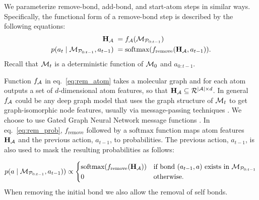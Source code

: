 We parameterize remove-bond, add-bond, and start-atom steps in similar ways. Specifically, the functional form of a remove-bond step is described by the following equations:
\begin{align}
{\mathbf{H}}_{{\mathcal{A}}} \;&= f_{{\mathcal{A}}}({\mathcal{M}}_{{\mathcal{P}}_{0:t-1}}) \label{eq:rem_atom} \\
p(a_t \mid {\mathcal{M}}_{{\mathcal{P}}_{0:t-1}}, a_{t-1}) \;&= \mbox{softmax}(f_{\textrm{remove}}({\mathbf{H}}_{{\mathcal{A}}}, a_{t-1})). \label{eq:rem_prob}\end{align}
Recall that ${\mathcal{M}}_t$ is a deterministic function of ${\mathcal{M}}_0$ and $a_{0:t-1}$.

Function $f_{{\mathcal{A}}}$ in eq.~\eqref{eq:rem_atom} takes a molecular graph and for each atom outputs a set of $d$-dimensional atom features, so that ${\mathbf{H}}_{{\mathcal{A}}} \subseteq \mathcal{R}^{|{\mathcal{A}}| \times d}$. 
In general $f_{{\mathcal{A}}}$ could be any deep graph model that uses the graph structure of ${\mathcal{M}}_t$ to get graph-isomorphic node features, usually via message-passing techniques \citep{gilmer2017neural}. We choose to use Gated Graph Neural Network message functions \citep{li2016gated}.
In eq.~\eqref{eq:rem_prob}, $f_{\textrm{remove}}$ followed by a $\mbox{softmax}$ function maps atom features ${\mathbf{H}}_{{\mathcal{A}}}$ and the previous action, $a_{t-1}$, to probabilities. The previous action, $a_{t-1}$, is also used to mask the resulting probabilities as follows:

\begin{align}
p(a \mid {\mathcal{M}}_{{\mathcal{P}}_{0:t-1}}, a_{t-1})) \propto 
\begin{cases}
\mbox{softmax}(f_{\textrm{remove}}({\mathbf{H}}_{{\mathcal{A}}})) & \mbox{if bond } (a_{t-1},a) \mbox{ exists in } {\mathcal{M}}_{{\mathcal{P}}_{0:t-1}} \\
0 & \mbox{otherwise}. \nonumber
\end{cases}
\end{align}
When removing the initial bond we also allow the removal of self bonds.

